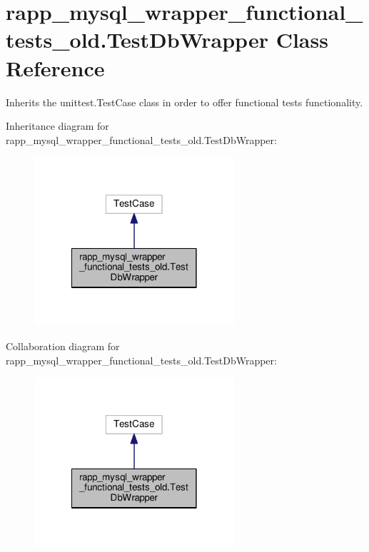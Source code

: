\hypertarget{classrapp__mysql__wrapper__functional__tests__old_1_1TestDbWrapper}{\section{rapp\-\_\-mysql\-\_\-wrapper\-\_\-functional\-\_\-tests\-\_\-old.\-Test\-Db\-Wrapper Class Reference}
\label{classrapp__mysql__wrapper__functional__tests__old_1_1TestDbWrapper}
}


Inherits the unittest.\-Test\-Case class in order to offer functional tests functionality.  




Inheritance diagram for rapp\-\_\-mysql\-\_\-wrapper\-\_\-functional\-\_\-tests\-\_\-old.\-Test\-Db\-Wrapper\-:
\nopagebreak
\begin{figure}[H]
\begin{center}
\leavevmode
\includegraphics[width=210pt]{classrapp__mysql__wrapper__functional__tests__old_1_1TestDbWrapper__inherit__graph}
\end{center}
\end{figure}


Collaboration diagram for rapp\-\_\-mysql\-\_\-wrapper\-\_\-functional\-\_\-tests\-\_\-old.\-Test\-Db\-Wrapper\-:
\nopagebreak
\begin{figure}[H]
\begin{center}
\leavevmode
\includegraphics[width=210pt]{classrapp__mysql__wrapper__functional__tests__old_1_1TestDbWrapper__coll__graph}
\end{center}
\end{figure}

